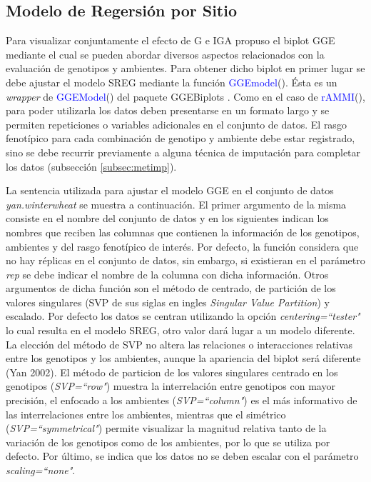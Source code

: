 \subsection{Modelo de Regersión por Sitio}
\label{subsec:SREGpaquete}
Para visualizar conjuntamente el efecto de G e IGA \citet{Yanetal2000} propuso el biplot GGE mediante el cual se pueden abordar diversos aspectos relacionados con la evaluación de genotipos y ambientes. Para obtener dicho biplot en primer lugar se debe ajustar el modelo SREG mediante la función \textcolor{blue}{GGEmodel}(). Ésta es un \emph{wrapper} de \textcolor{blue}{GGEModel}() del paquete GGEBiplots \citep{Dumble2017}. Como en el caso de \textcolor{blue}{rAMMI}(), para poder utilizarla los datos deben presentarse en un formato largo y se permiten repeticiones o variables adicionales en el conjunto de datos. El rasgo fenotípico para cada combinación de genotipo y ambiente debe estar registrado, sino se debe recurrir previamente a alguna técnica de imputación para completar los datos (subsección  \ref{subsec:metimp}). 

La sentencia utilizada para ajustar el modelo GGE en el conjunto de datos \emph{yan.winterwheat} se muestra a continuación. El primer argumento de la misma consiste en el nombre del conjunto de datos y en los siguientes indican los nombres que reciben las columnas que contienen la información de los genotipos, ambientes y del rasgo fenotípico de interés. Por defecto, la función considera que no hay réplicas en el conjunto de datos, sin embargo, si existieran en el parámetro \emph{rep} se debe indicar el nombre de la columna con dicha información. Otros argumentos de dicha función son el método de centrado, de partición de los valores singulares (SVP de sus siglas en ingles \emph{Singular Value Partition}) y escalado. Por defecto los datos se centran utilizando la opción \emph{centering=``tester"} lo cual resulta en el modelo SREG, otro valor dará lugar a un modelo diferente. La elección del método de SVP no altera las relaciones o interacciones relativas entre los genotipos y los ambientes, aunque la apariencia del biplot será diferente (Yan 2002). El método de particion de los valores singulares centrado en los genotipos (\emph{SVP=``row"}) muestra la interrelación entre genotipos con mayor precisión, el enfocado a los ambientes (\emph{SVP=``column"}) es el más informativo de las interrelaciones entre los ambientes, mientras que el simétrico (\emph{SVP=``symmetrical"}) permite visualizar la magnitud relativa tanto de la variación de los genotipos como de los ambientes, por lo que se utiliza por defecto. Por último, se indica que los datos no se deben escalar con el parámetro \emph{scaling=``none"}. \\

